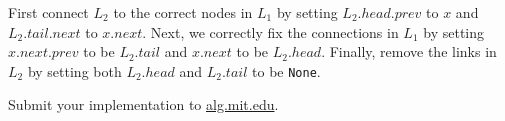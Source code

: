 \documentclass[12pt,twoside]{article}
\begin{document}
\begin{problems}
\begin{problemparts}
\problempart %
First connect \(L_2\) to the correct nodes in \(L_1\) by setting \(L_2.head.prev\) to \(x\) and \(L_2.tail.next\) to \(x.next\). Next, we correctly fix the connections in \(L_1\) by setting \(x.next.prev\) to be \(L_2.tail\) and \(x.next\) to be \(L_2.head\). Finally, remove the links in \(L_2\) by setting both \(L_2.head\) and \(L_2.tail\) to be \verb|None|.

\problempart Submit your implementation to {\small\url{alg.mit.edu}}.
\end{problemparts}

\end{problems}
\end{document}
